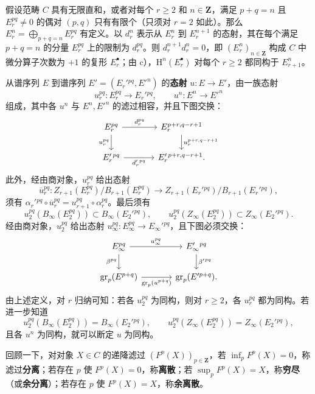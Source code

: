 假设范畴 $C$ 具有无限直和，或者对每个 $r\geq2$ 和 $n\in\mathbf Z$，满足 $p+q=n$ 且 $E_r^{pq}\ne0$ 的偶对 $(p,q)$ 只有有限个（只须对 $r=2$ 如此）。那么 $E_r^n=\bigoplus_{p+q=n}E_r^{pq}$ 有定义。以 $d_r^n$ 表示从 $E_r^n$ 到 $E_r^{n+1}$ 的态射，其在每个满足 $p+q=n$ 的分量 $E_r^{pq}$ 上的限制为 $d_r^{pq}$。则 $d_r^{n+1}d_r^n=0$，即 $(E_r^n)_{n\in\mathbf Z}$ 构成 $C$ 中微分算子次数为 $+1$ 的复形 $E_r^\bullet$；由 c），$\mathrm H^n(E_r^\bullet)$ 对每个 $r\geq2$ 都同构于 $E_{r+1}^n$。

从谱序列 $E$ 到谱序列 $E'=(E_r'{}^{pq},E'^n)$ 的\textbf{态射} $u:E\to E'$，由一族态射
\[
u_r^{pq}:E_r^{pq}\to E_r'{}^{pq},\qquad u^n:E^n\to E'^n
\]
组成，其中各 $u^n$ 与 $E^n,E'^n$ 的滤过相容，并且下图交换：
\[
\begin{tikzcd}[column sep=large]
E_r^{pq}\arrow[r,"d_r^{pq}"]\arrow[d,"u_r^{pq}"']&E_r^{p+r,q-r+1}\arrow[d,"u_r^{p+r,q-r+1}"]\\
E_r'{}^{pq}\arrow[r,"d_r'{}^{pq}"']&E_r'{}^{p+r,q-r+1}.
\end{tikzcd}
\]
此外，经由商对象，$u_r^{pq}$ 给出态射
\[
\overline u_r^{pq}:Z_{r+1}(E_r^{pq})/B_{r+1}(E_r^{pq})\longrightarrow
Z_{r+1}(E_r'{}^{pq})/B_{r+1}(E_r'{}^{pq}),
\]
须有 $\alpha_r'{}^{pq}\circ\overline u_r^{pq}=u_{r+1}^{pq}\circ\alpha_r^{pq}$。最后须有
\[
u_2^{pq}(B_\infty(E_2^{pq}))\subset B_\infty(E_2'{}^{pq}),\qquad
u_2^{pq}(Z_\infty(E_2^{pq}))\subset Z_\infty(E_2'{}^{pq}).
\]
经由商对象，$u_2^{pq}$ 给出态射 $u_\infty^{pq}:E_\infty^{pq}\to E_\infty'{}^{pq}$，且下图必须交换：
\[
\begin{tikzcd}[column sep=large]
E_\infty^{pq}\arrow[r,"u_\infty^{pq}"]\arrow[d,"\beta^{pq}"']&E_\infty'{}^{pq}\arrow[d,"\beta'{}^{pq}"]\\
\gr_p(E^{p+q})\arrow[r,"\gr_p(u^{p+q})"']&\gr_p(E'^{p+q}).
\end{tikzcd}
\]
由上述定义，对 $r$ 归纳可知：若各 $u_2^{pq}$ 为同构，则对 $r\geq2$，各 $u_r^{pq}$ 都为同构。若进一步知道
\[
u_2^{pq}(B_\infty(E_2^{pq}))=B_\infty(E_2'{}^{pq}),\qquad
u_2^{pq}(Z_\infty(E_2^{pq}))=Z_\infty(E_2'{}^{pq}),
\]
且各 $u^n$ 为同构，就可以断定 $u$ 为同构。

回顾一下，对对象 $X\in C$ 的递降滤过 $(F^p(X))_{p\in\mathbf Z}$，若 $\inf_pF^p(X)=0$，称滤过\textbf{分离}；若存在 $p$ 使 $F^p(X)=0$，称\textbf{离散}；若 $\sup_pF^p(X)=X$，称\textbf{穷尽}（或\textbf{余分离}）；若存在 $p$ 使 $F^p(X)=X$，称\textbf{余离散}。

